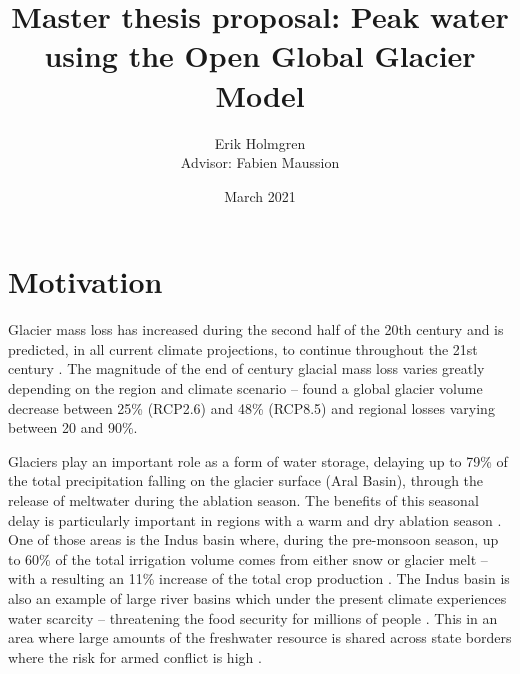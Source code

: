 \documentclass[12pt, a4paper]{article}
\author{Erik Holmgren \\ Advisor: Fabien Maussion}
\title{Master thesis proposal: Peak water using the Open Global Glacier Model}
\date{March 2021}
\begin{document}
\maketitle
\noindent
\section{Motivation}
Glacier mass loss has increased during the second half of the 20th century
\parencite{vaughanObservationsCryosphere2013} and is predicted, in all current
climate projections, to continue throughout the 21st century
\parencite{ipccClimateChange20142014}. The magnitude of the end of century
glacial mass loss varies greatly depending on the region and climate scenario --
\textcite{hussNewModelGlobal2015} found a global glacier volume decrease between
25\% (RCP2.6) and 48\% (RCP8.5) and regional losses varying between 20 and 90\%.



Glaciers play an important role as a form of water storage, delaying up to 79\%
of the total precipitation falling on the glacier surface (Aral Basin), through
the release of meltwater during the ablation season. The benefits of this
seasonal delay is particularly important in regions with a warm and dry ablation
season \parencite{kaserContributionPotentialGlaciers2010}. One of those areas is
the Indus basin where, during the pre-monsoon season, up to 60\% of the total
irrigation volume comes from either snow or glacier melt -- with a resulting an
11\% increase of the total crop production
\parencite{biemansImportanceSnowGlacier2019}. The Indus basin is also an example
of large river basins which under the present climate experiences water scarcity
-- threatening the food security for millions of people
\parencite{kummuClimatedrivenInterannualVariability2014}. This in an area where
large amounts of the freshwater resource is shared across state borders where
the risk for armed conflict is high
\parencite{schleussnerArmedconflictRisksEnhanced2016,
pritchardAsiaShrinkingGlaciers2019}. 
\end{document}
